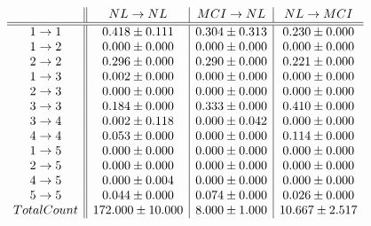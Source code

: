 \documentclass[12pt,a4paper]{article}
\begin{document}
\[ \begin{array}{ c || c | c | c }
 & NL \rightarrow NL & MCI \rightarrow NL & NL \rightarrow MCI \\
\hline
\hline
1 \rightarrow 1 & 0.418 \pm 0.111 & 0.304 \pm 0.313 & 0.230 \pm 0.000 \\
1 \rightarrow 2 & 0.000 \pm 0.000 & 0.000 \pm 0.000 & 0.000 \pm 0.000 \\
2 \rightarrow 2 & 0.296 \pm 0.000 & 0.290 \pm 0.000 & 0.221 \pm 0.000 \\
1 \rightarrow 3 & 0.002 \pm 0.000 & 0.000 \pm 0.000 & 0.000 \pm 0.000 \\
2 \rightarrow 3 & 0.000 \pm 0.000 & 0.000 \pm 0.000 & 0.000 \pm 0.000 \\
3 \rightarrow 3 & 0.184 \pm 0.000 & 0.333 \pm 0.000 & 0.410 \pm 0.000 \\
3 \rightarrow 4 & 0.002 \pm 0.118 & 0.000 \pm 0.042 & 0.000 \pm 0.000 \\
4 \rightarrow 4 & 0.053 \pm 0.000 & 0.000 \pm 0.000 & 0.114 \pm 0.000 \\
1 \rightarrow 5 & 0.000 \pm 0.000 & 0.000 \pm 0.000 & 0.000 \pm 0.000 \\
2 \rightarrow 5 & 0.000 \pm 0.000 & 0.000 \pm 0.000 & 0.000 \pm 0.000 \\
4 \rightarrow 5 & 0.000 \pm 0.004 & 0.000 \pm 0.000 & 0.000 \pm 0.000 \\
5 \rightarrow 5 & 0.044 \pm 0.000 & 0.074 \pm 0.000 & 0.026 \pm 0.000 \\
Total Count & 172.000 \pm 10.000 & 8.000 \pm 1.000 & 10.667 \pm 2.517\\
\end{array} \]
\end{document}
